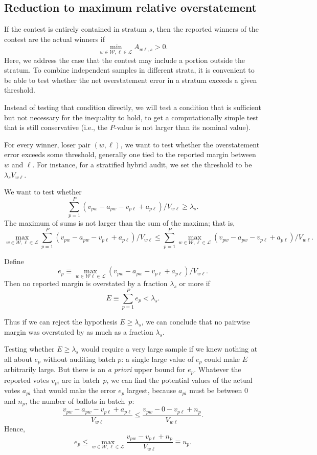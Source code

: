 \documentclass[runningheads]{llncs}
\begin{document}
\subsection{Reduction to maximum relative overstatement}
If the contest is entirely contained in stratum $s$, then
the reported winners of the contest are the actual winners if
$$ 
   \min_{w \in \mathcal{W}, \ell \in \mathcal{L}} A_{w\ell,s} > 0.
$$
Here, we address the case that the contest may include a portion outside the stratum.
To combine independent samples in different strata, it is convenient
to be able to test whether the net overstatement error in a stratum exceeds a given threshold.

Instead of testing that condition directly, we will test a condition that is sufficient 
but not necessary for the inequality to hold, to get a computationally simple test that
is still conservative (i.e., the $P$-value is not larger than its nominal value).

For every winner, loser pair $(w, \ell)$, we want to test
whether the overstatement error exceeds some threshold, generally
one tied to the reported margin between $w$ and $\ell$.
For instance, for a stratified hybrid audit, we set the threshold to be
$\lambda_s V_{w\ell}$.

We want to test whether
$$
   \sum_{p=1}^P (v_{pw}-a_{pw} - v_{p\ell} + a_{p\ell})/V_{w\ell} \ge \lambda_s.
$$
The maximum of sums is not larger than the sum of the maxima; that is,
$$
\max_{w \in \mathcal{W},  \ell \in \mathcal{L}}
   \sum_{p=1}^P (v_{pw}-a_{pw} - v_{p\ell} + a_{p\ell})/V_{w\ell}
   \le
  \sum_{p=1}^P  \max_{w \in \mathcal{W},  \ell \in \mathcal{L}} 
  (v_{pw}-a_{pw} - v_{p\ell} + a_{p\ell})/V_{w\ell}.
$$

Define 
$$
  e_p \equiv \max_{w \in \mathcal{W} \ell \in \mathcal{L}} 
     (v_{pw}-a_{pw} - v_{p\ell} + a_{p\ell})/V_{w\ell}.
$$
Then no reported margin is overstated by a fraction $\lambda_s$ or more
if 
$$ 
  E \equiv \sum_{p=1}^P e_p < \lambda_s.
$$

Thus if we can reject the hypothesis $E \ge \lambda_s$, we can conclude that
no pairwise margin was overstated by as much as a fraction $\lambda_s$.

Testing whether $E \ge \lambda_s$ would require a very large sample if we knew nothing at
all about $e_p$ without auditing batch $p$: a single large value of $e_p$ could make
$E$ arbitrarily large.
But there is an \emph{a priori} upper bound for $e_p$.
Whatever the reported votes $v_{pi}$ are in batch~$p$, we can find the
potential values of the actual votes $a_{pi}$ that would make the
error $e_p$ largest, because $a_{pi}$ must be between 0 and $n_p$,
the number of ballots in batch~$p$:
$$
    \frac{v_{pw}-a_{pw} - v_{p\ell} + a_{p\ell}}{V_{w\ell}} \le 
    \frac{v_{pw}- 0 - v_{p\ell} + n_p}{V_{w\ell}}.
$$
Hence,
\begin{equation} \label{eq:uDef}
    e_p \le \max_{w \in \mathcal{W}, \ell \in \mathcal{L}} 
    \frac{v_{pw} - v_{p\ell} + n_p}{V_{w\ell}} \equiv u_p.
\end{equation}
\end{document}
